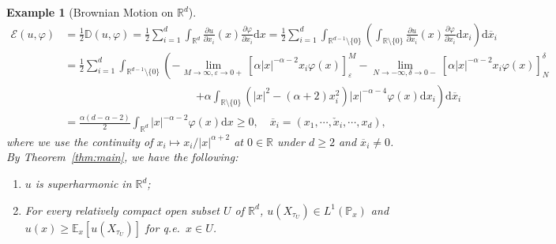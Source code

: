 \documentclass[12pt,a4paper]{article}
\newtheorem{example}[thm]{Example}
\renewcommand{\P}{\mathbb{P}}
\newcommand{\E}{\mathbb{E}}
\newcommand{\R}{\mathbb{R}}
\renewcommand{\d}{\mathrm{d}}
\newcommand{\1}{{\bf 1}}
\newcommand{\eps}{{\varepsilon}}
\begin{document}
\begin{example}[Brownian Motion on $\R^d$]
\begin{align*}
 \mathscr{E}(u,\varphi)&=\frac12\mathbb{D}(u,\varphi)
 =\frac12\sum_{i=1}^d\int_{\R^d}\frac{\partial u}{\partial x_i}(x)
 \frac{\partial \varphi}{\partial x_i}{\d} x=\frac12\sum_{i=1}^d\int_{\R^{d-1}\setminus\{0\}}\left(\int_{\R\setminus\{0\}}\frac{\partial u}{\partial x_i}(x)
 \frac{\partial \varphi}{\partial x_i}{\d} x_i \right){\d} \overline{x}_i
\\
 &=\frac12\sum_{i=1}^d\int_{\R^{d-1}\setminus\{0\}}\left(-
 \lim_{M\to\infty,\eps\to0+}\left[\alpha|x|^{-\alpha-2}x_i
 \varphi(x) \right]_{\eps}^{M}
 -\lim_{N\to-\infty,\delta\to0-}\left[\alpha|x|^{-\alpha-2}x_i
 \varphi(x) \right]^{\delta}_{N}\right.\\
 &\hspace{5cm}\left.
 +\alpha\int_{\R\setminus\{0\}}
 (|x|^2-(\alpha+2)x_i^2)|x|^{-\alpha-4}
 \varphi(x){\d} x_i
 \right){\d} \overline{x}_i\\
 &=\frac{\alpha(d-\alpha-2)}{2}\int_{\R^d}|x|^{-\alpha-2}\varphi(x){\d} x\geq0,\quad \overline{x}_i=(x_1,\cdots, \check{x}_i,\cdots, x_d),
  \end{align*}  
  where  
 we use the continuity of 
 $x_i\mapsto x_i/|x|^{\alpha+2}$ at $0\in\R$ under 
 $d\geq2$ and $\overline{x}_i\ne0$.
By Theorem~\ref{thm:main}, we have the following: 
\begin{enumerate}
\item\label{item:superharmstable1a} $u$ is superharmonic in $\R^d$;
\item\label{item:superharmstable2a}
For  every relatively compact open subset $U$ of $\R^d$, $u(X_{\tau_U})\in L^1(\P_x)$ and
$u(x)\geq\E_x[u(X_{\tau_U})]$ for q.e.~$x\in U$.
\end{enumerate}
 \end{example}
\end{document}
